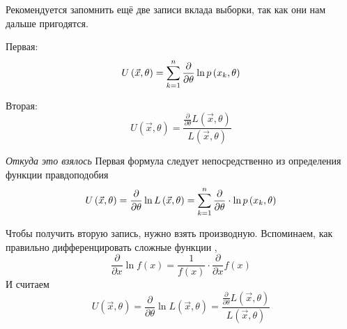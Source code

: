 \begin{remark}\label{remark:defU}
  Рекомендуется запомнить ещё две записи вклада выборки, так как они нам
  дальше пригодятся.

  Первая:
  \begin{align*}
    U\left( \vec{x},\theta \right)
    = \sum_{k=1}^n\frac{\partial}{\partial\theta}\ln{p\left(x_k,\theta\right)}
  \end{align*}

  Вторая:
  $$U\left( \vec{x},\theta \right)
    = \frac{\frac{\partial}{\partial\theta}L\left(\vec{x},\theta\right)}
      {L\left(\vec{x},\theta\right)}$$
\end{remark}
\textit{Откуда это взялось}
Первая формула следует непосредственно из определения функции правдоподобия
$$U\left( \vec{x},\theta \right)
    = \frac{\partial}{\partial\theta}\ln{L\left(\vec{x},\theta\right)}
    = \sum_{k=1}^n
      \frac{\partial}{\partial\theta}\cdot \ln{p\left(x_k,\theta\right)}$$

Чтобы получить вторую запись, нужно взять производную.
Вспоминаем, как правильно дифференцировать сложные функции
\cite[с.~226]{Fichtenholz1}, \cite[с.~133]{DorogovtsevMA}
$$\frac{\partial}{\partial x} \ln{f\left( x \right)}
  = \frac{1}{f\left( x \right)}
    \cdot \frac{\partial}{\partial x} f\left( x \right)$$
И считаем
$$U\left( \vec{x},\theta \right)
  = \frac{\partial}{\partial\theta}\ln{L\left(\vec{x},\theta\right)}
  = \frac{\frac{\partial}{\partial\theta}L\left(\vec{x},\theta\right)}
    {L\left(\vec{x},\theta\right)}$$

